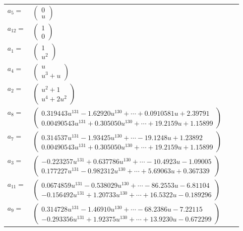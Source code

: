 \documentclass[1p]{elsarticle_modified}
\theoremstyle{definition}
\begin{document}
\begin{tabular}{m{7pt} m{180pt} m{7pt} m{180pt} }
\flushright $a_{5}=$&$\begin{pmatrix}0\\u\end{pmatrix}$ \\
\flushright $a_{12}=$&$\begin{pmatrix}1\\0\end{pmatrix}$ \\
\flushright $a_{1}=$&$\begin{pmatrix}1\\u^2\end{pmatrix}$ \\
\flushright $a_{4}=$&$\begin{pmatrix}u\\u^3+u\end{pmatrix}$ \\
\flushright $a_{2}=$&$\begin{pmatrix}u^2+1\\u^4+2 u^2\end{pmatrix}$ \\
\flushright $a_{8}=$&$\begin{pmatrix}0.319443 u^{131}-1.62920 u^{130}+\cdots+0.0910581 u+2.39791\\0.00490543 u^{131}+0.305050 u^{130}+\cdots+19.2159 u+1.15899\end{pmatrix}$ \\
\flushright $a_{7}=$&$\begin{pmatrix}0.314537 u^{131}-1.93425 u^{130}+\cdots-19.1248 u+1.23892\\0.00490543 u^{131}+0.305050 u^{130}+\cdots+19.2159 u+1.15899\end{pmatrix}$ \\
\flushright $a_{3}=$&$\begin{pmatrix}-0.223257 u^{131}+0.637786 u^{130}+\cdots-10.4923 u-1.09005\\0.177227 u^{131}-0.982312 u^{130}+\cdots+5.69063 u+0.367339\end{pmatrix}$ \\
\flushright $a_{11}=$&$\begin{pmatrix}0.0674859 u^{131}-0.538029 u^{130}+\cdots-86.2553 u-6.81104\\-0.156492 u^{131}+1.20733 u^{130}+\cdots+16.5322 u-0.189296\end{pmatrix}$ \\
\flushright $a_{9}=$&$\begin{pmatrix}0.314728 u^{131}-1.46910 u^{130}+\cdots-68.2386 u-7.22115\\-0.293356 u^{131}+1.92375 u^{130}+\cdots+13.9230 u-0.672299\end{pmatrix}$ \\

\end{tabular}
\end{document}

